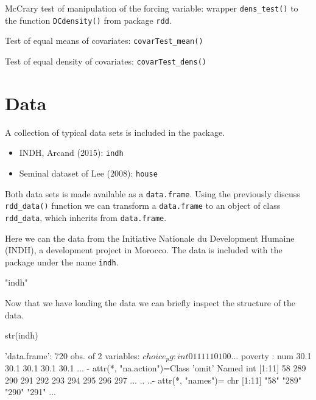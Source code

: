 \documentclass[article]{jss}
\begin{document}
McCrary test of manipulation of the forcing variable: wrapper
\texttt{dens\_test()} to the function \texttt{DCdensity()} from package
\texttt{rdd}.

Test of equal means of covariates: \texttt{covarTest\_mean()}

Test of equal density of covariates: \texttt{covarTest\_dens()}

\section{Data}\label{data}

A collection of typical data sets is included in the package.

\begin{itemize}
\itemsep1pt\parskip0pt
\item
  INDH, Arcand (2015): \texttt{indh}
\item
  Seminal dataset of Lee (2008): \texttt{house}
\end{itemize}

Both data sets is made available as a \texttt{data.frame}. Using the
previously discuss \texttt{rdd\_data()} function we can transform a
\texttt{data.frame} to an object of class \texttt{rdd\_data}, which
inherits from \texttt{data.frame}.

Here we can the data from the Initiative Nationale du Development
Humaine (INDH), a development project in Morocco. The data is included
with the package under the name \texttt{indh}.

\begin{CodeChunk}
\begin{CodeOutput}
[1] "indh"
\end{CodeOutput}
\end{CodeChunk}

Now that we have loading the data we can briefly inspect the structure
of the data.

\begin{CodeChunk}
\begin{CodeInput}
str(indh)
\end{CodeInput}
\begin{CodeOutput}
'data.frame':   720 obs. of  2 variables:
 $ choice_pg: int  0 1 1 1 1 1 0 1 0 0 ...
 $ poverty  : num  30.1 30.1 30.1 30.1 30.1 ...
 - attr(*, "na.action")=Class 'omit'  Named int [1:11] 58 289 290 291 292 293 294 295 296 297 ...
  .. ..- attr(*, "names")= chr [1:11] "58" "289" "290" "291" ...
\end{CodeOutput}
\end{CodeChunk}
\end{document}
